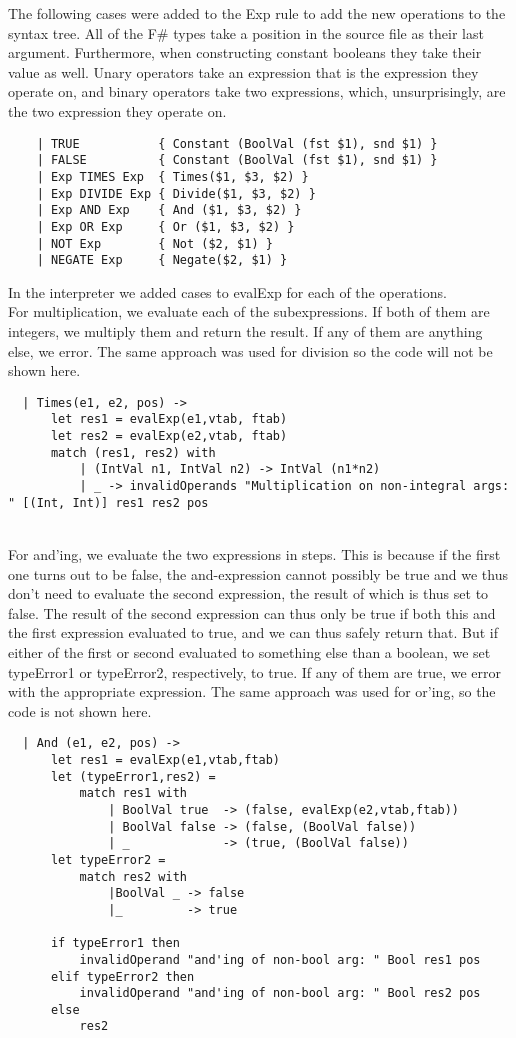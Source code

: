 The following cases were added to the Exp rule to add the new operations to the syntax tree. All of the F\# types take a position in the source file as their last argument. Furthermore, when constructing constant booleans they take their value as well. Unary operators take an expression that is the expression they operate on, and binary operators take two expressions, which, unsurprisingly, are the two expression they operate on.
\begin{verbatim}
    | TRUE           { Constant (BoolVal (fst $1), snd $1) }
    | FALSE          { Constant (BoolVal (fst $1), snd $1) }
    | Exp TIMES Exp  { Times($1, $3, $2) }
    | Exp DIVIDE Exp { Divide($1, $3, $2) }
    | Exp AND Exp    { And ($1, $3, $2) }
    | Exp OR Exp     { Or ($1, $3, $2) }
    | NOT Exp        { Not ($2, $1) }
    | NEGATE Exp     { Negate($2, $1) }
 \end{verbatim} 


In the interpreter we added cases to evalExp for each of the operations. \\

For multiplication, we evaluate each of the subexpressions. If both of them are integers, we multiply them and return the result. If any of them are anything else, we error. The same approach was used for division so the code will not be shown here.
\begin{verbatim}
  | Times(e1, e2, pos) ->
      let res1 = evalExp(e1,vtab, ftab)
      let res2 = evalExp(e2,vtab, ftab)
      match (res1, res2) with
          | (IntVal n1, IntVal n2) -> IntVal (n1*n2)
          | _ -> invalidOperands "Multiplication on non-integral args: " [(Int, Int)] res1 res2 pos
\end{verbatim}
~\\

For and'ing, we evaluate the two expressions in steps. This is because if the first one turns out to be false, the and-expression cannot possibly be true and we thus don't need to evaluate the second expression, the result of which is thus set to false. The result of the second expression can thus only be true if both this and the first expression evaluated to true, and we can thus safely return that. But if either of the first or second evaluated to something else than a boolean, we set typeError1 or typeError2, respectively, to true. If any of them are true, we error with the appropriate expression. The same approach was used for or'ing, so the code is not shown here.
\begin{verbatim}
  | And (e1, e2, pos) ->
      let res1 = evalExp(e1,vtab,ftab)
      let (typeError1,res2) =
          match res1 with
              | BoolVal true  -> (false, evalExp(e2,vtab,ftab))
              | BoolVal false -> (false, (BoolVal false))
              | _             -> (true, (BoolVal false))
      let typeError2 =
          match res2 with
              |BoolVal _ -> false
              |_         -> true

      if typeError1 then
          invalidOperand "and'ing of non-bool arg: " Bool res1 pos
      elif typeError2 then
          invalidOperand "and'ing of non-bool arg: " Bool res2 pos
      else
          res2
\end{verbatim}
~\\

